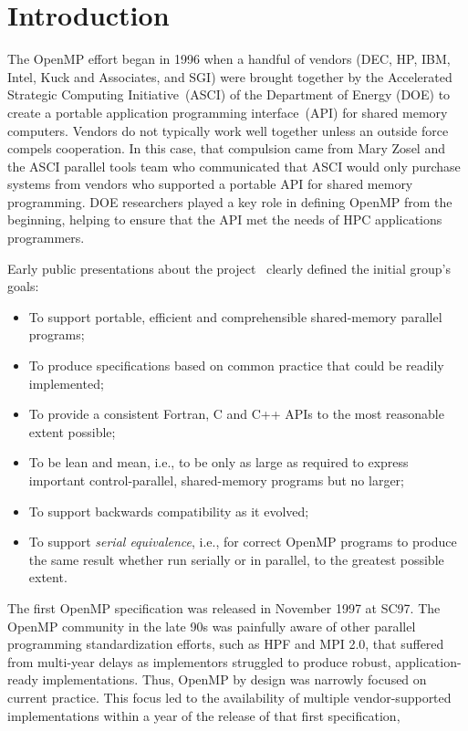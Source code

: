 \section{Introduction}
\label{sec:intro}

The OpenMP effort began in 1996 when a handful of vendors (DEC, HP, IBM, 
Intel, Kuck and Associates, and SGI) were brought together by the Accelerated 
Strategic Computing Initiative~(ASCI) of the Department of Energy (DOE) to 
create a portable application programming interface~(API) for shared memory 
computers. Vendors do not typically work well together unless an outside 
force compels cooperation. In this case, that compulsion came from Mary 
Zosel and the ASCI parallel tools team who communicated that ASCI would 
only purchase systems from vendors who supported a portable API for shared 
memory programming. DOE researchers played a key role in defining OpenMP 
from the beginning, helping to ensure that the API met the needs of HPC 
applications programmers.

Early public presentations about the project~\cite{ewomp99} clearly
defined the initial group's goals:

\begin{itemize}
  \item To support portable, efficient and comprehensible shared-memory 
        parallel programs;
  \item To produce specifications based on common practice that 
        could be readily implemented;
  \item To provide a consistent Fortran, C and C++ APIs to the 
        most reasonable extent possible;
  \item To be lean and mean, i.e., to  be only as large as required 
        to express important control-parallel, shared-memory programs  
        but no larger;
  \item To support backwards compatibility as it evolved;
  \item To support \emph{serial equivalence}, i.e., for correct OpenMP 
        programs to produce the same result whether run serially or in
        parallel, to the greatest possible extent.
\end{itemize}

The first OpenMP specification  was released in November 1997 at SC97. The
OpenMP community in the late 90s was painfully aware of other parallel
programming  standardization efforts, such as HPF and MPI 2.0, that
suffered from multi-year delays as implementors struggled to produce robust,
application-ready implementations. Thus, OpenMP by design was narrowly
focused on current practice. This focus led to the availability of multiple
vendor-supported implementations within a year of the release of that 
first specification, 

